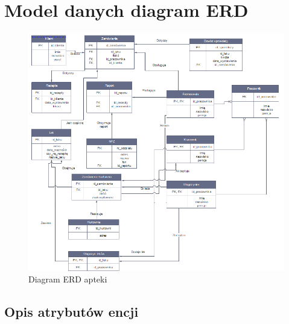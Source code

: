 \documentclass[a4paper, 11pt]{article}
\begin{document}
	\section{Model danych diagram ERD}
	
			\begin{figure}[H]
			\centerline{\includegraphics[scale=1]{ERD.png}}
			\caption{Diagram ERD apteki}
			\end{figure}
	\subsection{Opis atrybutów encji}
	
	
\end{document}
